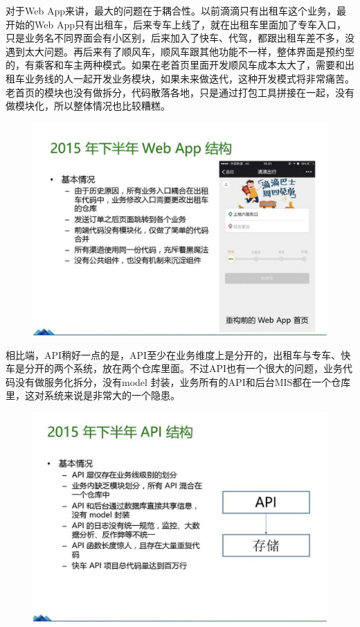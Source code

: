 \documentclass[12pt]{article}
\begin{document}
对于Web App来讲，最大的问题在于耦合性。以前滴滴只有出租车这个业务，最开始的Web App只有出租车，后来专车上线了，就在出租车里面加了专车入口，只是业务名不同界面会有小区别，后来加入了快车、代驾，都跟出租车差不多，没遇到太大问题。再后来有了顺风车，顺风车跟其他功能不一样，整体界面是预约型的，有乘客和车主两种模式。如果在老首页里面开发顺风车成本太大了，需要和出租车业务线的人一起开发业务模块，如果未来做迭代，这种开发模式将非常痛苦。老首页的模块也没有做拆分，代码散落各地，只是通过打包工具拼接在一起，没有做模块化，所以整体情况也比较糟糕。

\begin{figure}[H]
    \centering
    \includegraphics[width=1\textwidth]{fig/DIDI_Reconstruction_6.png}
\end{figure}

相比端，API稍好一点的是，API至少在业务维度上是分开的，出租车与专车、快车是分开的两个系统，放在两个仓库里面。不过API也有一个很大的问题，业务代码没有做服务化拆分，没有model 封装，业务所有的API和后台MIS都在一个仓库里，这对系统来说是非常大的一个隐患。

\begin{figure}[H]
    \centering
    \includegraphics[width=1\textwidth]{fig/DIDI_Reconstruction_7.png}
\end{figure}
\end{document}
